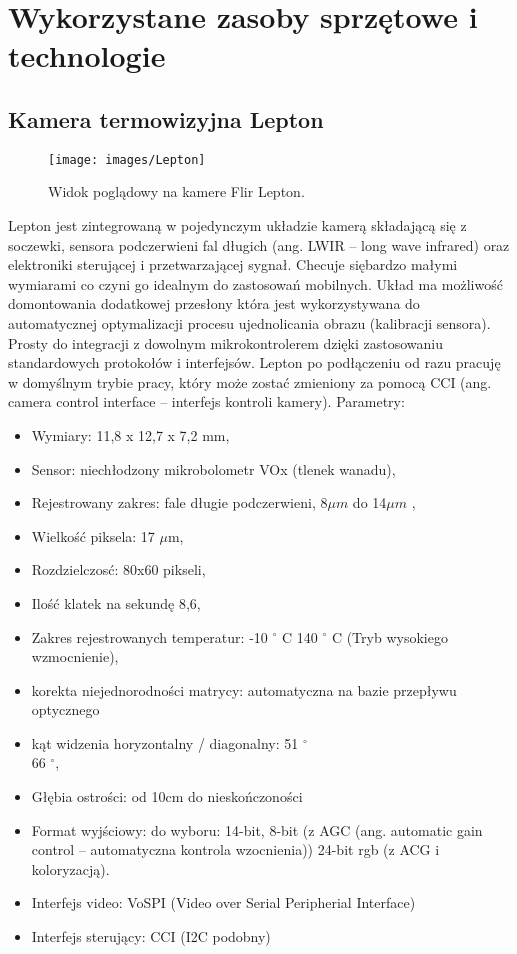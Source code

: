 
\chapter{Wykorzystane zasoby sprzętowe i technologie}
\label{cha:hw}
\section{Kamera termowizyjna Lepton}

\begin{figure}[h]
    \centering
    \texttt{[image: images/Lepton]}
    \caption{Widok poglądowy na kamere Flir Lepton.}
    \label{fig:lepton}
\end{figure}
 
Lepton jest zintegrowaną w pojedynczym układzie kamerą składającą się z soczewki, sensora podczerwieni fal długich (ang. LWIR – long wave infrared) oraz elektroniki sterującej i przetwarzającej sygnał. Checuje siębardzo małymi wymiarami co czyni go idealnym do zastosowań mobilnych. Układ ma możliwość domontowania dodatkowej przesłony która jest wykorzystywana do automatycznej optymalizacji procesu ujednolicania obrazu (kalibracji sensora).
Prosty do integracji z dowolnym mikrokontrolerem dzięki zastosowaniu standardowych protokołów i interfejsów. Lepton po podłączeniu od razu pracuję w domyślnym trybie pracy, który może zostać zmieniony za pomocą CCI (ang. camera control interface – interfejs kontroli kamery).\cite{lepton}
Parametry:
\begin{itemize}
\item Wymiary: 11,8 x 12,7 x 7,2 mm, 
\item Sensor: niechłodzony mikrobolometr VOx (tlenek wanadu),
\item Rejestrowany zakres: fale długie podczerwieni, 8$\mu m$ do 14$\mu m$ ,
\item Wielkość piksela: 17 $\mu$m,
\item Rozdzielczosć: 80x60 pikseli,
\item Ilość klatek na sekundę 8,6,
\item Zakres rejestrowanych temperatur: -10  $^\circ$  C 140  $^\circ$  C (Tryb wysokiego wzmocnienie),
\item korekta niejednorodności matrycy: automatyczna na bazie przepływu optycznego
\item kąt widzenia horyzontalny / diagonalny: 51 $^\circ$ \\ 66 $^\circ$,
\item Głębia ostrości: od 10cm do nieskończoności
\item Format wyjściowy: do wyboru: 14-bit, 8-bit (z AGC (ang. automatic gain control – automatyczna kontrola wzocnienia)) 24-bit rgb (z ACG i koloryzacją).
\item Interfejs video: VoSPI (Video over Serial Peripherial Interface)
\item Interfejs sterujący: CCI (I2C podobny)
\end{itemize}
